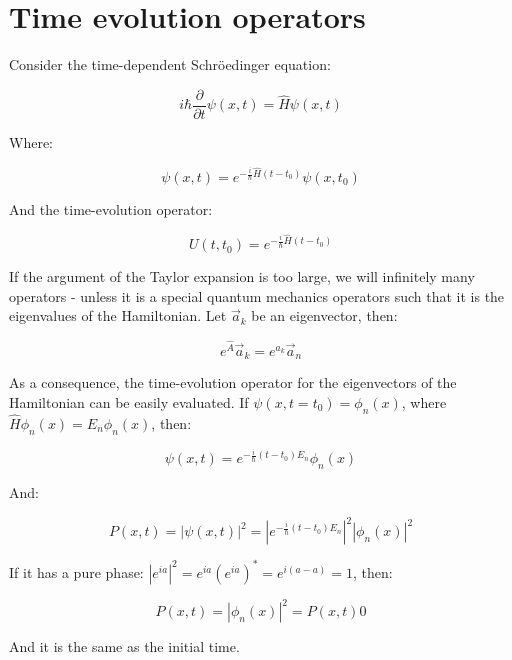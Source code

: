 \section{Time evolution operators}
Consider the time-dependent Schr\"oedinger equation:

$$i\hbar\frac{\partial}{\partial t}\psi(x,t) = \hat{H}\psi(x,t)$$

Where:

$$\psi(x,t) = e^{-\frac{i}{\hbar}\hat{H}(t-t_0)}\psi(x,t_0)$$

And the time-evolution operator:

$$U(t,t_0) = e^{-\frac{i}{\hbar}\hat{H}(t-t_0)}$$

If the argument of the Taylor expansion is too large, we will infinitely many operators - unless it is a special quantum mechanics operators such that it is the eigenvalues of the Hamiltonian.
Let $\vec{a}_k$ be an eigenvector, then:

$$e^{\hat{A}}\vec{a}_k = e^{a_k}\vec{a}_n$$

As a consequence, the time-evolution operator for the eigenvectors of the Hamiltonian can be easily evaluated.
If $\psi(x,t=t_0) = \phi_n(x)$, where $\hat{H}\phi_n(x) = E_n\phi_n(x)$, then:

$$\psi(x,t) = e^{-\frac{i}{\hbar}(t-t_0)E_n}\phi_n(x)$$

And:

$$P(x,t) = |\psi(x,t)|^2 = |e^{-\frac{i}{\hbar}(t-t_0)E_n}|^2|\phi_n(x)|^2$$

If it has a pure phase: $|e^{ia}|^2 = e^{ia}(e^{ia})^* = e^{i(a-a)} = 1$, then:

$$P(x,t) = |\phi_n(x)|^2 = P(x,t)0$$

And it is the same as the initial time.
